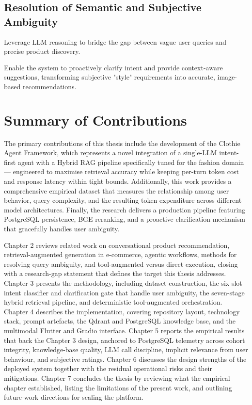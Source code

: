 \subsection{Resolution of Semantic and Subjective Ambiguity}


Leverage LLM reasoning to bridge the gap between vague user queries and precise product discovery.

Enable the system to proactively clarify intent and provide context-aware suggestions, transforming subjective "style" requirements into accurate, image-based recommendations.

\section{Summary of Contributions}

The primary contributions of this thesis include the development of the Clothie Agent Framework, which represents a novel integration of a single-LLM intent-first agent with a Hybrid RAG pipeline specifically tuned for the fashion domain --- engineered to maximise retrieval accuracy while keeping per-turn token cost and response latency within tight bounds. Additionally, this work provides a comprehensive empirical dataset that measures the relationship among user behavior, query complexity, and the resulting token expenditure across different model architectures. Finally, the research delivers a production pipeline featuring PostgreSQL persistence, BGE reranking, and a proactive clarification mechanism that gracefully handles user ambiguity.

Chapter 2 reviews related work on conversational product recommendation, retrieval-augmented generation in e-commerce, agentic workflows, methods for resolving query ambiguity, and tool-augmented versus direct execution, closing with a research-gap statement that defines the target this thesis addresses. Chapter 3 presents the methodology, including dataset construction, the six-slot intent classifier and clarification gate that handle user ambiguity, the seven-stage hybrid retrieval pipeline, and deterministic tool-augmented orchestration. Chapter 4 describes the implementation, covering repository layout, technology stack, prompt artefacts, the Qdrant and PostgreSQL knowledge base, and the multimodal Flutter and Gradio interface. Chapter 5 reports the empirical results that back the Chapter 3 design, anchored to PostgreSQL telemetry across cohort integrity, knowledge-base quality, LLM call discipline, implicit relevance from user behaviour, and subjective ratings. Chapter 6 discusses the design strengths of the deployed system together with the residual operational risks and their mitigations. Chapter 7 concludes the thesis by reviewing what the empirical chapter established, listing the limitations of the present work, and outlining future-work directions for scaling the platform.
